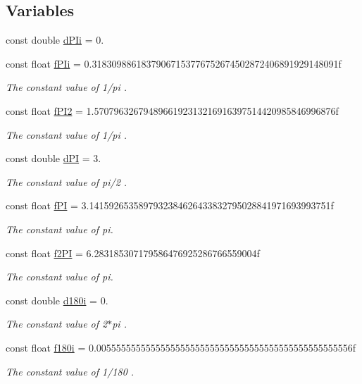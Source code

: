 \subsection*{\-Variables}
\begin{DoxyCompactItemize}
\item 
const double \hyperlink{namespaceblaf_a4e8539a7ba1e59181f96a61f75e0d5c4}{d\-P\-Ii} = 0.
\item 
const float \hyperlink{namespaceblaf_af3ff8c6e001f8a2feb4a77da9bf2e6c0}{f\-P\-Ii} = 0.\-31830988618379067153776752674502872406891929148091f
\begin{DoxyCompactList}\small\item\em \-The constant value of 1/pi . \end{DoxyCompactList}\item 
const float \hyperlink{namespaceblaf_a412381b69e677733ea60507300a9ed89}{f\-P\-I2} = 1.\-5707963267948966192313216916397514420985846996876f
\begin{DoxyCompactList}\small\item\em \-The constant value of 1/pi . \end{DoxyCompactList}\item 
const double \hyperlink{namespaceblaf_a0f1a9f0fcfddbfaa44708b1c6d04f90d}{d\-P\-I} = 3.
\begin{DoxyCompactList}\small\item\em \-The constant value of pi/2 . \end{DoxyCompactList}\item 
const float \hyperlink{namespaceblaf_a5a52b16b2ea821b08e581b86b1eba264}{f\-P\-I} = 3.\-1415926535897932384626433832795028841971693993751f
\begin{DoxyCompactList}\small\item\em \-The constant value of pi. \end{DoxyCompactList}\item 
const float \hyperlink{namespaceblaf_a41ca3a503ed60c1cd58e835e9a2c4a24}{f2\-P\-I} = 6.\-283185307179586476925286766559004f
\begin{DoxyCompactList}\small\item\em \-The constant value of pi. \end{DoxyCompactList}\item 
const double \hyperlink{namespaceblaf_a31bb1ef78c52eefff47dfda93e32b329}{d180i} = 0.
\begin{DoxyCompactList}\small\item\em \-The constant value of 2$\ast$pi . \end{DoxyCompactList}\item 
const float \hyperlink{namespaceblaf_a270acc6912897636164a3a4e43592b56}{f180i} = 0.\-0055555555555555555555555555555555555555555555555556f
\begin{DoxyCompactList}\small\item\em \-The constant value of 1/180 . \end{DoxyCompactList}\end{DoxyCompactItemize}


